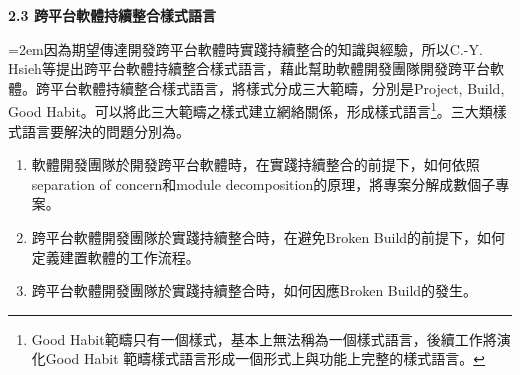 \documentclass[10pt, twocolumn]{article}
\begin{document}
\begin{raggedright}\textbf{2.3 跨平台軟體持續整合樣式語言}\end{raggedright}

\parindent=2em因為期望傳達開發跨平台軟體時實踐持續整合的知識與經驗，所以C.-Y. Hsieh等提出跨平台軟體持續整合樣式語言，藉此幫助軟體開發團隊開發跨平台軟體。跨平台軟體持續整合樣式語言，將樣式分成三大範疇，分別是Project, Build, Good Habit。可以將此三大範疇之樣式建立網絡關係，形成樣式語言\footnote{Good Habit範疇只有一個樣式，基本上無法稱為一個樣式語言，後續工作將演化Good Habit 範疇樣式語言形成一個形式上與功能上完整的樣式語言。}。三大類樣式語言要解決的問題分別為。
\begin{enumerate}
\item 軟體開發團隊於開發跨平台軟體時，在實踐持續整合的前提下，如何依照separation of concern和module decomposition的原理\cite{satextbook}，將專案分解成數個子專案。
\item 跨平台軟體開發團隊於實踐持續整合時，在避免Broken Build的前提下，如何定義建置軟體的工作流程。
\item 跨平台軟體開發團隊於實踐持續整合時，如何因應Broken Build的發生。
\end{enumerate}

\end{document}
